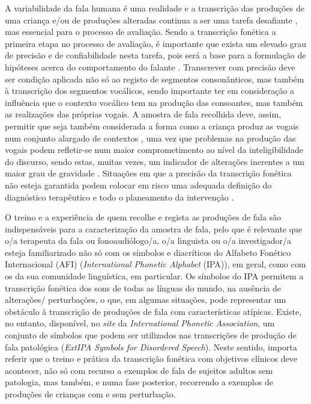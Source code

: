 \documentclass[output=paper,colorlinks,citecolor=brown,booklanguage=portuguese]{langscibook}
\begin{document}
A variabilidade da fala humana é uma realidade e a transcrição das produções de uma criança e/ou de produções alteradas continua a ser uma tarefa desafiante \citep{Stemberger2019}, mas essencial para o processo de avaliação. Sendo a transcrição fonética a primeira etapa no processo de avaliação, é importante que exista um elevado grau de precisão e de confiabilidade nesta tarefa, pois será a base para a formulação de hipóteses acerca do comportamento do falante \citep{Howard2002}. Transcrever com precisão deve ser condição aplicada não só ao registo de segmentos consonânticos, mas também à transcrição dos segmentos vocálicos, sendo importante ter em consideração a influência que o contexto vocálico tem na produção das consoantes, mas também as realizações das próprias vogais. A amostra de fala recolhida deve, assim, permitir que seja também considerada a forma como a criança produz as vogais num conjunto alargado de contextos \citep{Bates2017}, uma vez que problemas na produção das vogais podem refletir-se num maior comprometimento ao nível da inteligibilidade do discurso, sendo estas, muitas vezes, um indicador de alterações inerentes a um maior grau de gravidade \citep{Bowen2015, Shriberg2012}. Situações em que a precisão da transcrição fonética não esteja garantida podem colocar em risco uma adequada definição do diagnóstico terapêutico e todo o planeamento da intervenção \citep{Bates2017}.

O treino e a experiência de quem recolhe e regista as produções de fala são indispensáveis para a caracterização da amostra de fala, pelo que é relevante que o/a terapeuta da fala ou fonoaudiólogo/a, o/a linguista ou o/a investigador/a esteja familiarizado não só com os símbolos e diacríticos do Alfabeto Fonético Internacional (AFI) (\emph{International Phonetic Alphabet} (IPA)), em geral, como com os da sua comunidade linguística, em particular. Os símbolos do IPA permitem a transcrição fonética dos sons de todas as línguas do mundo, na ausência de alterações/ perturbações, o que, em algumas situações, pode representar um obstáculo à transcrição de produções de fala com características atípicas. Existe, no entanto, disponível, no \emph{site} da \emph{International Phonetic Association}, um conjunto de símbolos que podem ser utilizados nas transcrições de produção de fala patológica (\emph{ExtIPA Symbols for Disordered Speech}). Neste sentido, importa referir que o treino e prática da transcrição fonética com objetivos clínicos deve acontecer, não só com recurso a exemplos de fala de sujeitos adultos sem patologia, mas também, e numa fase posterior, recorrendo a exemplos de produções de crianças com e sem perturbação.
\end{document}
